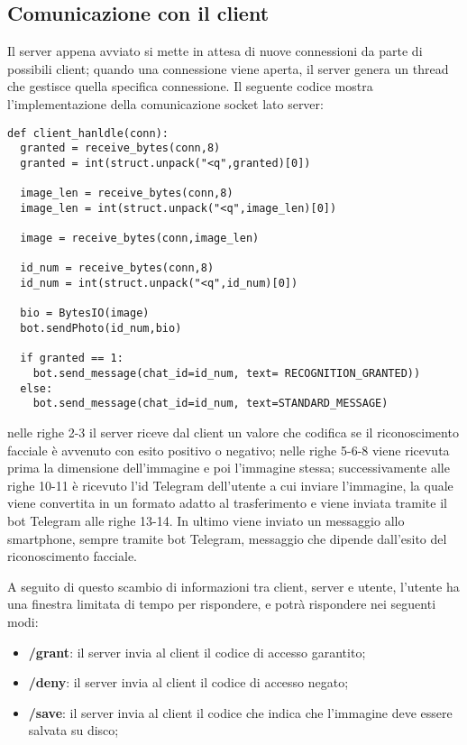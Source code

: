\subsection{Comunicazione con il client}
Il server appena avviato si mette in attesa di nuove connessioni da parte di possibili client; quando una connessione viene aperta, il server genera un thread che gestisce quella specifica connessione.
Il seguente codice mostra l'implementazione della comunicazione socket lato server:
\begin{lstlisting}
def client_hanldle(conn):
  granted = receive_bytes(conn,8)
  granted = int(struct.unpack("<q",granted)[0])

  image_len = receive_bytes(conn,8)
  image_len = int(struct.unpack("<q",image_len)[0])

  image = receive_bytes(conn,image_len)

  id_num = receive_bytes(conn,8)
  id_num = int(struct.unpack("<q",id_num)[0])

  bio = BytesIO(image)
  bot.sendPhoto(id_num,bio)

  if granted == 1:
    bot.send_message(chat_id=id_num, text= RECOGNITION_GRANTED))
  else:
    bot.send_message(chat_id=id_num, text=STANDARD_MESSAGE)
\end{lstlisting}
nelle righe 2-3 il server riceve dal client un valore che codifica se il riconoscimento facciale è avvenuto con esito positivo o negativo; nelle righe 5-6-8 viene ricevuta prima la dimensione dell'immagine e poi l'immagine stessa; successivamente alle righe 10-11 è ricevuto l'id Telegram dell'utente a cui inviare l'immagine, la quale viene convertita in un formato adatto al trasferimento e viene inviata tramite il bot Telegram alle righe 13-14. In ultimo viene inviato un messaggio allo smartphone, sempre tramite bot Telegram, messaggio che dipende dall'esito del riconoscimento facciale.

A seguito di questo scambio di informazioni tra client, server e utente, l'utente ha una finestra limitata di tempo per rispondere, e potrà rispondere nei seguenti modi:
\begin{itemize}
	\item \textbf{/grant}: il server invia al client il codice di accesso garantito;
	\item \textbf{/deny}: il server invia al client il codice di accesso negato;
	\item \textbf{/save}: il server invia al client il codice che indica che l'immagine deve essere salvata su disco;
\end{itemize}

